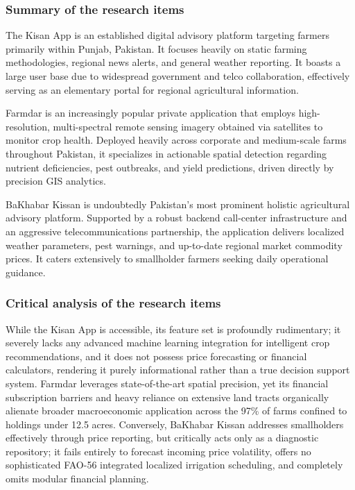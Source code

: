 \subsubsection{Summary of the research items}
The Kisan App \cite{kisanapp2024} is an established digital advisory platform targeting farmers primarily within Punjab, Pakistan. It focuses heavily on static farming methodologies, regional news alerts, and general weather reporting. It boasts a large user base due to widespread government and telco collaboration, effectively serving as an elementary portal for regional agricultural information.

Farmdar \cite{farmdar2024} is an increasingly popular private application that employs high-resolution, multi-spectral remote sensing imagery obtained via satellites to monitor crop health. Deployed heavily across corporate and medium-scale farms throughout Pakistan, it specializes in actionable spatial detection regarding nutrient deficiencies, pest outbreaks, and yield predictions, driven directly by precision GIS analytics.

BaKhabar Kissan \cite{bakhabarkissan2024} is undoubtedly Pakistan's most prominent holistic agricultural advisory platform. Supported by a robust backend call-center infrastructure and an aggressive telecommunications partnership, the application delivers localized weather parameters, pest warnings, and up-to-date regional market commodity prices. It caters extensively to smallholder farmers seeking daily operational guidance.

\subsubsection{Critical analysis of the research items}
While the Kisan App \cite{kisanapp2024} is accessible, its feature set is profoundly rudimentary; it severely lacks any advanced machine learning integration for intelligent crop recommendations, and it does not possess price forecasting or financial calculators, rendering it purely informational rather than a true decision support system. Farmdar \cite{farmdar2024} leverages state-of-the-art spatial precision, yet its financial subscription barriers and heavy reliance on extensive land tracts organically alienate broader macroeconomic application across the 97\% of farms confined to holdings under 12.5 acres. Conversely, BaKhabar Kissan \cite{bakhabarkissan2024} addresses smallholders effectively through price reporting, but critically acts only as a diagnostic repository; it fails entirely to forecast incoming price volatility, offers no sophisticated FAO-56 integrated localized irrigation scheduling, and completely omits modular financial planning.

